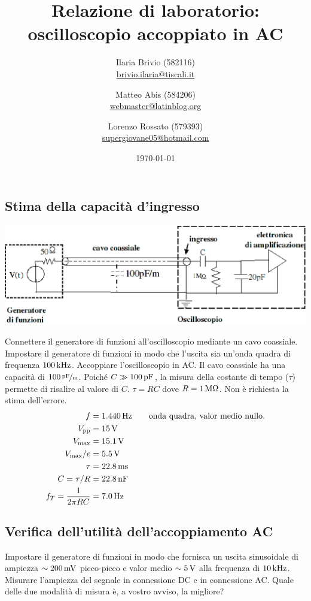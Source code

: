\documentclass[italian,a4paper]{article}
\begin{document}
\title{Relazione di laboratorio: oscilloscopio accoppiato in AC}
\author{\normalsize Ilaria Brivio (582116)\\%
\normalsize \url{brivio.ilaria@tiscali.it}%
\and %
\normalsize Matteo Abis (584206)\\ %
\normalsize \url{webmaster@latinblog.org}
\and %
\normalsize Lorenzo Rossato (579393)\\ %
\normalsize \url{supergiovane05@hotmail.com}}
\date{\today}
\maketitle
\subsection*{Stima della capacità d'ingresso}
\begin{center}
 \includegraphics[height=9\baselineskip]{circuito2.eps}
\end{center}
Connettere il generatore di funzioni all’oscilloscopio mediante un cavo coassiale. Impostare il generatore di
funzioni in modo che l'uscita sia un'onda quadra di frequenza  $\unit[100]{kHz}$. Accoppiare l'oscilloscopio
in AC.
Il cavo coassiale ha una capacità di $\unitfrac[100]{pF}{m}$. Poiché $C\gg \unit[100]{pF}$, la misura della
costante di tempo ($\tau$) permette di risalire al valore di $C$. $\tau=RC$ dove $R=\unit[1]{M\ohm}$. Non è
richiesta la stima dell’errore.
\begin{align*}
    f&=\unit[1.440]{Hz} \qquad \text{onda quadra, valor medio nullo.}\\
    V_{\text{pp}}&=\unit[15]{V}\\
    V_{\text{max}}&=\unit[15.1]{V}\\
    V_{\text{max}}/e&=\unit[5.5]{V}\\
    \tau&=\unit[22.8]{ms}\\
    C=\tau /R&=\unit[22.8]{nF}\\
    f_T=\frac{1}{2 \pi RC} &=\unit[7.0]{Hz}
\end{align*}
\newpage
\subsection*{Verifica dell'utilità dell’accoppiamento AC}
Impostare il generatore di funzioni in modo che fornisca un uscita sinusoidale di ampiezza $\sim
\unit[200]{mV}$ picco-picco e valor medio $\sim \unit[5]{V}$ alla frequenza di $\unit[10]{kHz}$. Misurare
l'ampiezza del segnale in connessione DC e in connessione AC. Quale delle due modalità di misura è, a vostro
avviso, la migliore?
\end{document}

